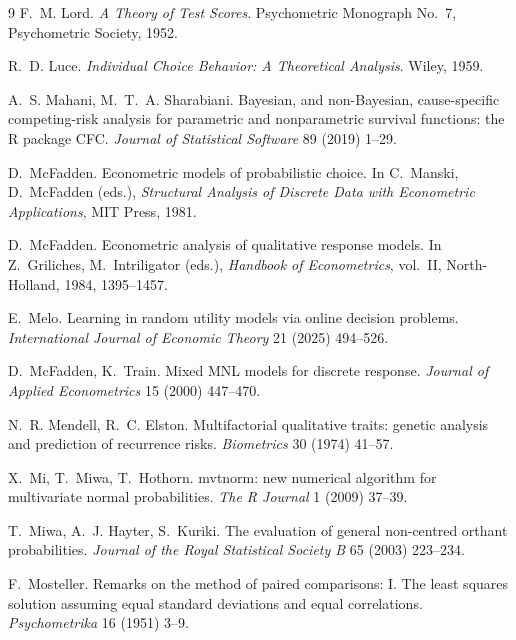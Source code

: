 \documentclass[12pt]{article}
\theoremstyle{remark}
\begin{document}
\begin{thebibliography}{9}
 F.~M. Lord. \emph{A Theory of Test
Scores}. Psychometric Monograph No.~7, Psychometric Society, 1952.

 R.~D. Luce. \emph{Individual Choice
Behavior: A Theoretical Analysis}. Wiley, 1959.

 A.~S. Mahani,
M.~T.~A. Sharabiani. Bayesian, and non-Bayesian, cause-specific
competing-risk analysis for parametric and nonparametric survival
functions: the R package CFC. \emph{Journal of Statistical Software} 89
(2019) 1--29.

 D.~McFadden. Econometric models of probabilistic
choice. In C.~Manski, D.~McFadden (eds.), \emph{Structural Analysis of
Discrete Data with Econometric Applications}, MIT Press, 1981.

 D.~McFadden. Econometric
analysis of qualitative response models. In Z.~Griliches,
M.~Intriligator (eds.), \emph{Handbook of Econometrics}, vol.~II,
North-Holland, 1984, 1395--1457.

 E.~Melo. Learning in random utility
models via online decision problems. \emph{International Journal of
Economic Theory} 21 (2025) 494--526.

 D.~McFadden,
K.~Train. Mixed MNL models for discrete response. \emph{Journal of
Applied Econometrics} 15 (2000) 447--470.

 N.~R. Mendell, R.~C. Elston. Multifactorial
qualitative traits: genetic analysis and prediction of recurrence risks.
\emph{Biometrics} 30 (1974) 41--57.

 X.~Mi, T.~Miwa,
T.~Hothorn. mvtnorm: new numerical algorithm for multivariate normal
probabilities. \emph{The R Journal} 1 (2009) 37--39.

 T.~Miwa,
A.~J. Hayter, S.~Kuriki. The evaluation of general non-centred orthant
probabilities. \emph{Journal of the Royal Statistical Society B} 65
(2003) 223--234.

 F.~Mosteller. Remarks on the
method of paired comparisons: I. The least squares solution assuming
equal standard deviations and equal correlations. \emph{Psychometrika}
16 (1951) 3--9.


\end{thebibliography}
\end{document}
